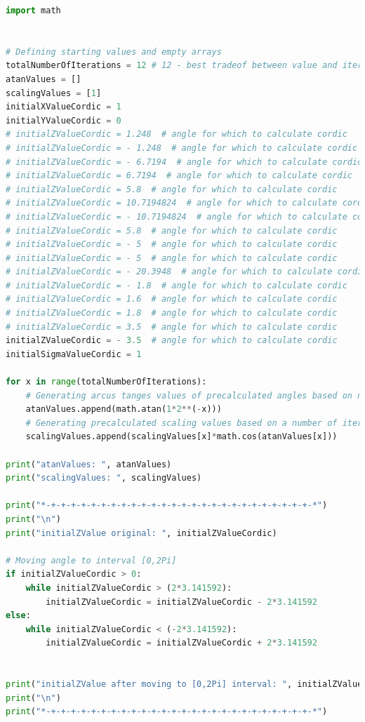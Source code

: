 \documentclass[a4paper, twoside, 11pt]{article}
\begin{document}
\begin{lstlisting}[language={python}, caption={Python code of \gls{abbreviation:cordic} implementation.}, label= {lst:python-cordic}]
import math


# Defining starting values and empty arrays
totalNumberOfIterations = 12 # 12 - best tradeof between value and iterations
atanValues = []
scalingValues = [1]
initialXValueCordic = 1
initialYValueCordic = 0
# initialZValueCordic = 1.248  # angle for which to calculate cordic
# initialZValueCordic = - 1.248  # angle for which to calculate cordic
# initialZValueCordic = - 6.7194  # angle for which to calculate cordic
# initialZValueCordic = 6.7194  # angle for which to calculate cordic
# initialZValueCordic = 5.8  # angle for which to calculate cordic
# initialZValueCordic = 10.7194824  # angle for which to calculate cordic
# initialZValueCordic = - 10.7194824  # angle for which to calculate cordic
# initialZValueCordic = 5.8  # angle for which to calculate cordic
# initialZValueCordic = - 5  # angle for which to calculate cordic
# initialZValueCordic = - 5  # angle for which to calculate cordic
# initialZValueCordic = - 20.3948  # angle for which to calculate cordic
# initialZValueCordic = - 1.8  # angle for which to calculate cordic
# initialZValueCordic = 1.6  # angle for which to calculate cordic
# initialZValueCordic = 1.8  # angle for which to calculate cordic
# initialZValueCordic = 3.5  # angle for which to calculate cordic
initialZValueCordic = - 3.5  # angle for which to calculate cordic
initialSigmaValueCordic = 1

for x in range(totalNumberOfIterations):
    # Generating arcus tanges values of precalculated angles based on number of iterations
    atanValues.append(math.atan(1*2**(-x)))
    # Generating precalculated scaling values based on a number of iterations
    scalingValues.append(scalingValues[x]*math.cos(atanValues[x]))

print("atanValues: ", atanValues)
print("scalingValues: ", scalingValues)

print("*-+-+-+-+-+-+-+-+-+-+-+-+-+-+-+-+-+-+-+-+-+-+-+-+-+-+-*")
print("\n")
print("initialZValue original: ", initialZValueCordic)

# Moving angle to interval [0,2Pi]
if initialZValueCordic > 0:
    while initialZValueCordic > (2*3.141592):
        initialZValueCordic = initialZValueCordic - 2*3.141592
else:
    while initialZValueCordic < (-2*3.141592):
        initialZValueCordic = initialZValueCordic + 2*3.141592


print("initialZValue after moving to [0,2Pi] interval: ", initialZValueCordic)
print("\n")
print("*-+-+-+-+-+-+-+-+-+-+-+-+-+-+-+-+-+-+-+-+-+-+-+-+-+-+-*")


\end{lstlisting}
\end{document}
